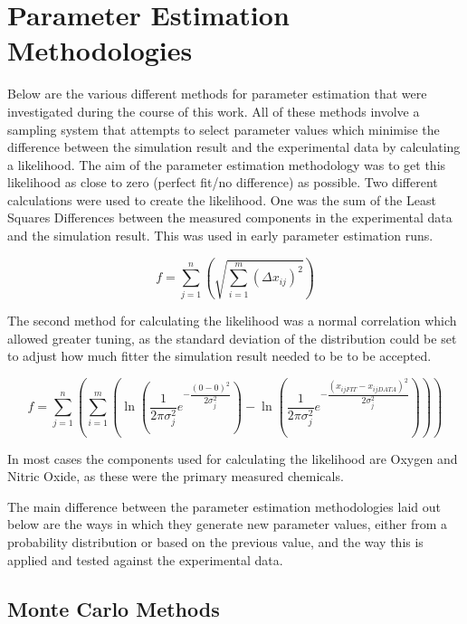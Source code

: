 \chapter{Parameter Estimation Methodologies}
\label{chap:paramest}

Below are the various different methods for parameter estimation that were investigated during the course of this work. All of these methods involve a sampling system that attempts to select parameter values which minimise the difference between the simulation result and the experimental data by calculating a likelihood. The aim of the parameter estimation methodology was to get this likelihood as close to zero (perfect fit/no difference) as possible. Two different calculations were used to create the likelihood. One was the sum of the Least Squares Differences between the measured components in the experimental data and the simulation result. This was used in early parameter estimation runs.

\begin{equation}
f = \sum^{n}_{j=1}\left(\sqrt{\sum^{m}_{i=1} (\Delta x_{ij})^2}\right)
\end{equation}

The second method for calculating the likelihood was a normal correlation which allowed greater tuning, as the standard deviation of the distribution could be set to adjust how much fitter the simulation result needed to be to be accepted.

\begin{equation}
f = \sum^{n}_{j=1}\left(\sum^{m}_{i=1}\left(\ln\left(\dfrac{1}{2\pi\sigma_j^2}e^{-\dfrac{{(0-0)^2}}{2\sigma_j^2}}\right) - \ln\left(\dfrac{1}{2\pi\sigma_j^2}e^{-\dfrac{{(x_{ijFIT}-x_{ijDATA})^2}}{2\sigma_j^2}}\right)\right)\right)
\end{equation}

In most cases the components used for calculating the likelihood are Oxygen and Nitric Oxide, as these were the primary measured chemicals.

The main difference between the parameter estimation methodologies laid out below are the ways in which they generate new parameter values, either from a probability distribution or based on the previous value, and the way this is applied and tested against the experimental data.

\section*{Monte Carlo Methods}

